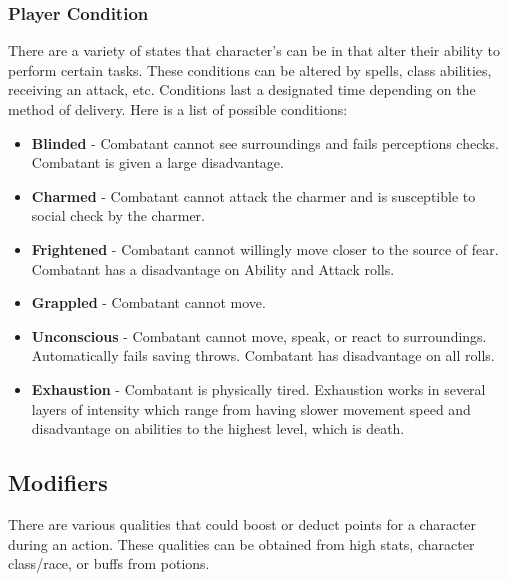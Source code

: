 \documentclass[12pt,a4paper]{report}
\begin{document}
		\subsubsection{Player Condition}
			There are a variety of states that character's can be in that alter their ability to perform certain tasks. These conditions can be altered by spells, class abilities, receiving an attack, etc. Conditions last a designated time depending on the method of delivery. Here is a list of possible conditions:
		\begin{itemize}
			\item \textbf{Blinded} - Combatant cannot see surroundings and fails perceptions checks. Combatant is given a large disadvantage.
			\item \textbf{Charmed} - Combatant cannot attack the charmer and is susceptible to social check by the charmer.
			\item \textbf{Frightened} - Combatant cannot willingly move closer to the source of fear. Combatant has a disadvantage on Ability and Attack rolls.
			\item \textbf{Grappled} - Combatant cannot move.
			\item \textbf{Unconscious} - Combatant cannot move, speak, or react to surroundings. Automatically fails saving throws. Combatant has disadvantage on all rolls.
			\item \textbf{Exhaustion} - Combatant is physically tired. Exhaustion works in several layers of intensity which range from having slower movement speed and disadvantage on abilities to the highest level, which is death.
		\end{itemize}
		\newpage
		\subsection{Modifiers}
			There are various qualities that could boost or deduct points for a character during an action. These qualities can be obtained from high stats, character class/race, or buffs from potions.
\end{document}
